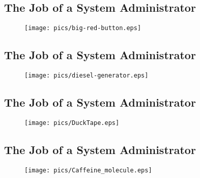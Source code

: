 \documentclass[xga]{xdvislides}
\begin{document}
\subsection{The Job of a System Administrator}
\vspace*{\fill}
\begin{figure}[hb]
	\begin{center}
		\texttt{[image: pics/big-red-button.eps]} \\
	\end{center}
\end{figure}
\vspace*{\fill}

\subsection{The Job of a System Administrator}
\vspace*{\fill}
\begin{figure}[hb]
	\begin{center}
		\texttt{[image: pics/diesel-generator.eps]} \\
	\end{center}
\end{figure}
\vspace*{\fill}

\subsection{The Job of a System Administrator}
\vspace*{\fill}
\begin{figure}[hb]
	\begin{center}
		\texttt{[image: pics/DuckTape.eps]} \\
	\end{center}
\end{figure}
\vspace*{\fill}

\subsection{The Job of a System Administrator}
\vspace*{\fill}
\begin{figure}[hb]
	\begin{center}
		\texttt{[image: pics/Caffeine\_molecule.eps]} \\
	\end{center}
\end{figure}
\vspace*{\fill}
\end{document}
